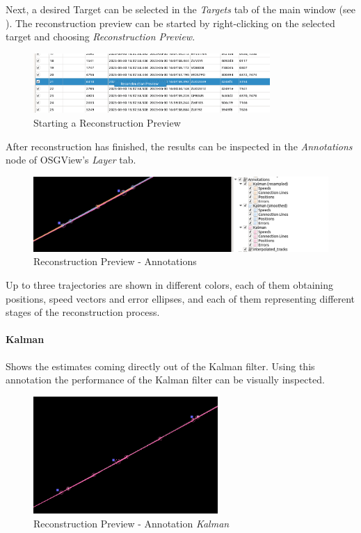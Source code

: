 Next, a desired Target can be selected in the \textit{Targets} tab of the main window (see ).
The reconstruction preview can be started by right-clicking on the selected target and choosing \textit{Reconstruction Preview}.

\begin{figure}[H]
    \center
      \includegraphics[width=9cm]{figures/ui_task_references_recprev_start.png}
    \caption{Starting a Reconstruction Preview} 
\end{figure}

After reconstruction has finished, the results can be inspected in the \textit{Annotations} node of OSGView's \textit{Layer} tab.

\begin{figure}[H]
    \center
      \includegraphics[width=12cm]{figures/ui_task_references_recprev_anno.png}
    \caption{Reconstruction Preview - Annotations} 
\end{figure}

Up to three trajectories are shown in different colors, each of them obtaining positions, speed vectors and error ellipses,
and each of them representing different stages of the reconstruction process.

\paragraph{Kalman} Shows the estimates coming directly out of the Kalman filter.
Using this annotation the performance of the Kalman filter can be visually inspected.

\begin{figure}[H]
    \center
      \includegraphics[width=7cm]{figures/ui_task_references_recprev_kalman.png}
    \caption{Reconstruction Preview - Annotation \textit{Kalman}} 
\end{figure}

